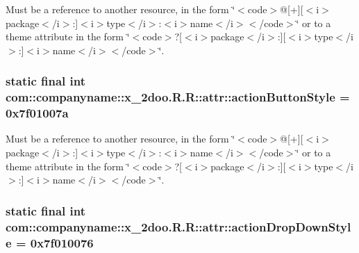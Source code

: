 Must be a reference to another resource, in the form \char`\"{}$<$code$>$@\mbox{[}+\mbox{]}\mbox{[}$<$i$>$package$<$/i$>$:\mbox{]}$<$i$>$type$<$/i$>$:$<$i$>$name$<$/i$>$$<$/code$>$\char`\"{} or to a theme attribute in the form \char`\"{}$<$code$>$?\mbox{[}$<$i$>$package$<$/i$>$:\mbox{]}\mbox{[}$<$i$>$type$<$/i$>$:\mbox{]}$<$i$>$name$<$/i$>$$<$/code$>$\char`\"{}. \hypertarget{classcom_1_1companyname_1_1x__2doo_1_1_r_1_1attr_a6d2224b15f9db704989d9599a66d549}{
\subsubsection[{actionButtonStyle}]{\setlength{\rightskip}{0pt plus 5cm}static final int com::companyname::x\_\-2doo.R.R::attr::actionButtonStyle = 0x7f01007a}}
\label{classcom_1_1companyname_1_1x__2doo_1_1_r_1_1attr_a6d2224b15f9db704989d9599a66d549}


Must be a reference to another resource, in the form \char`\"{}$<$code$>$@\mbox{[}+\mbox{]}\mbox{[}$<$i$>$package$<$/i$>$:\mbox{]}$<$i$>$type$<$/i$>$:$<$i$>$name$<$/i$>$$<$/code$>$\char`\"{} or to a theme attribute in the form \char`\"{}$<$code$>$?\mbox{[}$<$i$>$package$<$/i$>$:\mbox{]}\mbox{[}$<$i$>$type$<$/i$>$:\mbox{]}$<$i$>$name$<$/i$>$$<$/code$>$\char`\"{}. \hypertarget{classcom_1_1companyname_1_1x__2doo_1_1_r_1_1attr_2f1778415db338ada8ef074c30b230c4}{
\subsubsection[{actionDropDownStyle}]{\setlength{\rightskip}{0pt plus 5cm}static final int com::companyname::x\_\-2doo.R.R::attr::actionDropDownStyle = 0x7f010076}}
\label{classcom_1_1companyname_1_1x__2doo_1_1_r_1_1attr_2f1778415db338ada8ef074c30b230c4}


